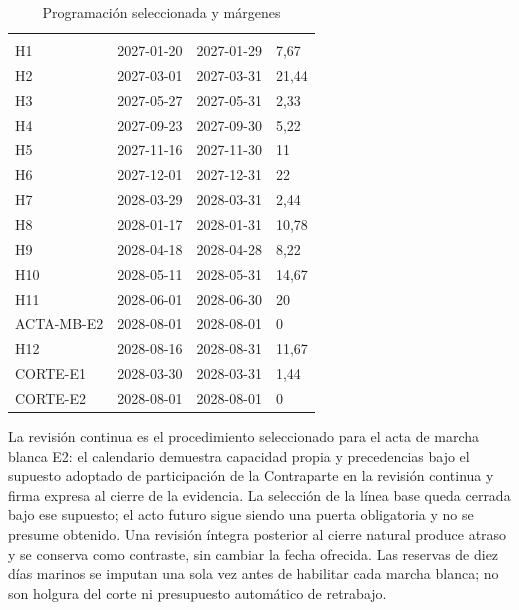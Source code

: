 \begingroup\small\begin{longtable}{L{25mm}L{26mm}L{26mm}R{26mm}}
\caption{Programación seleccionada y márgenes}\label{tab:sd7-hitos-globales}\\\hline
  &  &  & \\\hline\endfirsthead
\hline {} &  &  & \\\hline\endhead
H1 & 2027-01-20 & 2027-01-29 & 7,67\\\hline
H2 & 2027-03-01 & 2027-03-31 & 21,44\\\hline
H3 & 2027-05-27 & 2027-05-31 & 2,33\\\hline
H4 & 2027-09-23 & 2027-09-30 & 5,22\\\hline
H5 & 2027-11-16 & 2027-11-30 & 11\\\hline
H6 & 2027-12-01 & 2027-12-31 & 22\\\hline
H7 & 2028-03-29 & 2028-03-31 & 2,44\\\hline
H8 & 2028-01-17 & 2028-01-31 & 10,78\\\hline
H9 & 2028-04-18 & 2028-04-28 & 8,22\\\hline
H10 & 2028-05-11 & 2028-05-31 & 14,67\\\hline
H11 & 2028-06-01 & 2028-06-30 & 20\\\hline
ACTA-MB-E2 & 2028-08-01 & 2028-08-01 & 0\\\hline
H12 & 2028-08-16 & 2028-08-31 & 11,67\\\hline
CORTE-E1 & 2028-03-30 & 2028-03-31 & 1,44\\\hline
CORTE-E2 & 2028-08-01 & 2028-08-01 & 0\\\hline
\end{longtable}
\endgroup
La revisión continua es el procedimiento seleccionado para el acta de marcha blanca E2: el calendario demuestra capacidad propia y precedencias bajo el supuesto adoptado de participación de la Contraparte en la revisión continua y firma expresa al cierre de la evidencia. La selección de la línea base queda cerrada bajo ese supuesto; el acto futuro sigue siendo una puerta obligatoria y no se presume obtenido. Una revisión íntegra posterior al cierre natural produce atraso y se conserva como contraste, sin cambiar la fecha ofrecida. Las reservas de diez días marinos se imputan una sola vez antes de habilitar cada marcha blanca; no son holgura del corte ni presupuesto automático de retrabajo.~\parencite[arts.~17--18; pp.~12--13]{bases-admin}



